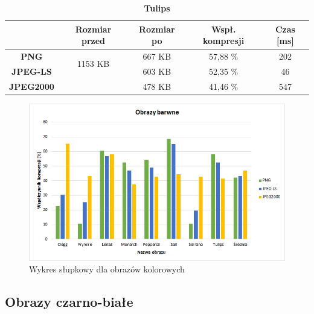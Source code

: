 \begin{table}[!h]
	\centering
	\caption{\textbf{Tulips}}
	\label{my-label}
	\begin{tabular}{|c|c|c|c|c|}                                             
		\hline
		& \textbf{Rozmiar przed} & \textbf{Rozmiar po} & \textbf{Wspł. kompresji} & \textbf{Czas {[}ms{]}} \\ \hline 
		\textbf{PNG}      &          \multicolumn{1}{c|}{\multirow{2}{*}{1153 KB}}             &        667 KB             &      57,88 \%                   &          202                   \\\cline{3-5}
		\textbf{JPEG-LS}  &                        &      603  KB             &       52,35 \%                  &          46                \\\cline{3-5}
		\textbf{JPEG2000} &                        &      478 KB               &       41,46 \%                  &     547                 \\ \hline
	\end{tabular}
\end{table}




\begin{figure}[!h]
	\centering
	\includegraphics[width=1.1\textwidth]{./color.png}
	\caption{Wykres słupkowy dla obrazów kolorowych}
	\label{img:color}
\end{figure}

\clearpage








\subsection{Obrazy czarno-białe}

